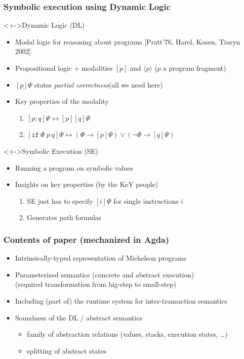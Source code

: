 \documentclass[aspectratio=1610]{beamer}
\begin{document}
\begin{frame}
  \frametitle{Symbolic execution using Dynamic Logic}
  \begin{block}<+->{Dynamic Logic (DL)}
  \begin{itemize}[<+->]
  \item Modal logic for reasoning about programs [Pratt'76, Harel, Kozen, Tiuryn 2002]
  \item Propositional logic $+$ modalities $[p]$ and $\langle p\rangle$ \qquad ($p$ a program fragment)
  \item $[p]\Psi$ states \emph{partial correctness}\hfil (all we need here)
  \item Key properties of the modality
    \begin{enumerate}
    \item $[p;q]\Psi \leftrightarrow [p][q]\Psi$
    \item $[\mathtt{if}~\Phi~p~q]\Psi \leftrightarrow (\Phi \to [p]\Psi) \vee (\neg\Phi \to [q]\Psi)$
  \end{enumerate}
  \end{itemize}
\end{block}
\begin{block}<+->{Symbolic Execution (SE)}
  \begin{itemize}[<+->]
  \item Running a program on symbolic values
  \item Insights on key properties (by the KeY people)
    \begin{enumerate}
    \item SE just has to specify $[i]\Psi$ for single instructions $i$
    \item Generates path formulas
  \end{enumerate}
  \end{itemize}
\end{block}
\end{frame}
\begin{frame}
  \frametitle{Contents of paper (mechanized in Agda)}
  \begin{itemize}
  \item Intrinsically-typed representation of Michelson programs
  \item Parameterized semantics (concrete and abstract execution)\\
    (required transformation from big-step to small-step)
  \item Including (part of) the runtime system for inter-transaction semantics
  \item Soundness of the DL / abstract semantics
    \begin{itemize}
    \item family of abstraction relations (values, stacks, execution states, \dots)
    \item splitting of abstract states
  \end{itemize}
  \end{itemize}
\end{frame}
\end{document}

